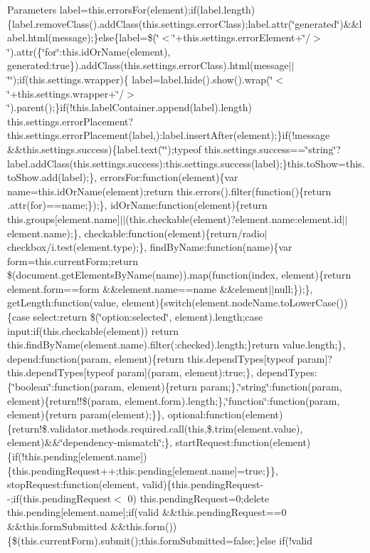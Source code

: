 \begin{DoxyParams}{Parameters}
label=this.\+errors\+For(element);if(label.\+length)\{label.\+remove\+Class().add\+Class(this.\+settings.\+error\+Class);label.\+attr(\char`\"{}generated\char`\"{})\&\&label.\+html(message);\}else\{label=\$(\char`\"{}$<$\char`\"{}+this.settings.\+error\+Element+\char`\"{}/$>$\char`\"{}).attr(\{\char`\"{}for\char`\"{}\+:this.\+id\+Or\+Name(element), generated\+:true\}).add\+Class(this.\+settings.\+error\+Class).html(message$\vert$$\vert$\char`\"{}\char`\"{});if(this.\+settings.\+wrapper)\{ label=label.\+hide().show().wrap(\char`\"{}$<$\char`\"{}+this.settings.\+wrapper+\char`\"{}/$>$\char`\"{}).parent();\}if(!this.label\+Container.\+append(label).length) this.\+settings.\+error\+Placement?this.\+settings.\+error\+Placement(label,)\+:label.\+insert\+After(element);\}if(!message \&\&this.\+settings.\+success)\{label.\+text(\char`\"{}\char`\"{});typeof this.\+settings.\+success==\char`\"{}string\char`\"{}?label.\+add\+Class(this.\+settings.\+success)\+:this.\+settings.\+success(label);\}this.\+to\+Show=this.\+to\+Show.\+add(label);\}, errors\+For\+:function(element)\{var name=this.\+id\+Or\+Name(element);return this.\+errors().filter(function()\{return .attr(\textquotesingle{}for\textquotesingle{})==name;\});\}, id\+Or\+Name\+:function(element)\{return this.\+groups\mbox{[}element.\+name\mbox{]}$\vert$$\vert$(this.\+checkable(element)?element.\+name\+:element.\+id$\vert$$\vert$element.name);\}, checkable\+:function(element)\{return/radio$\vert$checkbox/i.test(element.\+type);\}, find\+By\+Name\+:function(name)\{var form=this.\+current\+Form;return \$(document.\+get\+Elements\+By\+Name(name)).map(function(index, element)\{return element.\+form==form \&\&element.\+name==name \&\&element$\vert$$\vert$null;\});\}, get\+Length\+:function(value, element)\{switch(element.\+node\+Name.\+to\+Lower\+Case())\{case \textquotesingle{}select\textquotesingle{}\+:return \$(\char`\"{}option\+:selected\char`\"{}, element).length;case \textquotesingle{}input\textquotesingle{}\+:if(this.\+checkable(element)) return this.\+find\+By\+Name(element.\+name).filter(\textquotesingle{}\+:checked\textquotesingle{}).length;\}return value.\+length;\}, depend\+:function(param, element)\{return this.\+depend\+Types\mbox{[}typeof param\mbox{]}?this.\+depend\+Types\mbox{[}typeof param\mbox{]}(param, element)\+:true;\}, depend\+Types\+:\{\char`\"{}boolean\char`\"{}\+:function(param, element)\{return param;\},\char`\"{}string\char`\"{}\+:function(param, element)\{return!!\$(param, element.\+form).length;\},\char`\"{}function\char`\"{}\+:function(param, element)\{return param(element);\}\}, optional\+:function(element)\{return!\$.validator.\+methods.\+required.\+call(this,\$.trim(element.\+value), element)\&\&\char`\"{}dependency-\/mismatch\char`\"{};\}, start\+Request\+:function(element)\{if(!this.pending\mbox{[}element.\+name\mbox{]})\{this.\+pending\+Request++;this.\+pending\mbox{[}element.\+name\mbox{]}=true;\}\}, stop\+Request\+:function(element, valid)\{this.\+pending\+Request-\/-\/;if(this.\+pending\+Request$<$ 0) this.\+pending\+Request=0;delete this.\+pending\mbox{[}element.\+name\mbox{]};if(valid \&\&this.\+pending\+Request==0 \&\&this.\+form\+Submitted \&\&this.\+form())\{\$(this.\+current\+Form).submit();this.\+form\+Submitted=false;\}else if(!valid 
\end{DoxyParams}
